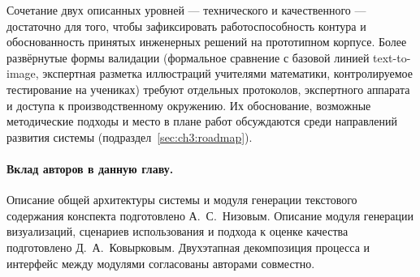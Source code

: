 Сочетание двух описанных уровней --- технического и качественного ---
достаточно для того, чтобы зафиксировать работоспособность контура и
обоснованность принятых инженерных решений на прототипном корпусе. Более
развёрнутые формы валидации (формальное сравнение с базовой линией
text\nobreakdash-to\nobreakdash-image, экспертная разметка иллюстраций
учителями математики, контролируемое тестирование на учениках) требуют
отдельных протоколов, экспертного аппарата и доступа к производственному
окружению. Их обоснование, возможные методические подходы и место в плане
работ обсуждаются среди направлений развития системы
(подраздел~\ref{sec:ch3:roadmap}).

\paragraph{Вклад авторов в данную главу.} Описание общей архитектуры системы и модуля генерации текстового содержания конспекта подготовлено А.~С.~Низовым. Описание модуля генерации визуализаций, сценариев использования и подхода к оценке качества подготовлено Д.~А.~Ковырковым. Двухэтапная декомпозиция процесса и интерфейс между модулями согласованы авторами совместно.